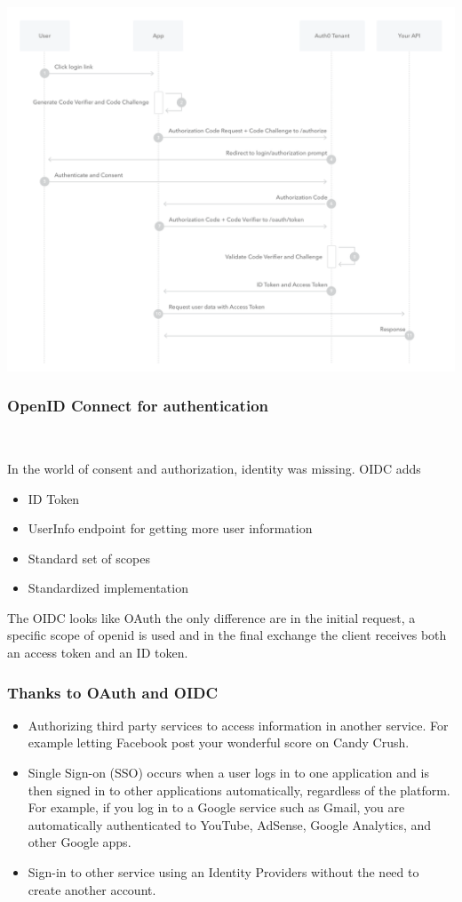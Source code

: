 \documentclass{beamer}
\begin{document}
\begin{frame}
	\includegraphics[width=\textwidth]{./resources/pkce-flow.png}
	
\end{frame}

\begin{frame}
	\frametitle{OpenID Connect for authentication}\ \newline
	
	In the world of consent and authorization, identity was missing.
	OIDC adds
	\begin{itemize}	
		 \item ID Token
		 \item UserInfo endpoint for getting more user information
		 \item Standard set of scopes
		 \item Standardized implementation
	\end{itemize}	
	The OIDC looks like OAuth the only difference are in the initial request, a specific scope of openid is used and in the final exchange the client receives both an access token and an ID token. 
\end{frame}

\begin{frame}
	\frametitle{Thanks to OAuth and OIDC}
	
	\begin{itemize}	
		 \item Authorizing third party services to access information in another service.
			For example letting Facebook post your wonderful score on Candy Crush.
	
		 \item Single Sign-on (SSO) occurs when a user logs in to one application and is then signed in to other applications automatically, regardless of the platform.
			For example, if you log in to a Google service such as Gmail, you are automatically authenticated to YouTube, AdSense, Google Analytics, and other Google apps.
	
		 \item Sign-in to other service using an Identity Providers without the need to create another account.
	\end{itemize}	
\end{frame}
\end{document}
